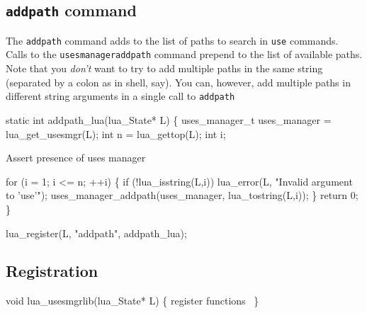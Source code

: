 \subsection{{\tt{}addpath} command}

The {\tt{}addpath} command adds to the list of paths to search in
{\tt{}use} commands.  Calls to the {\tt{}uses{}manager{}addpath} command
prepend to the list of available paths.  Note that you \emph{don't}
want to try to add multiple paths in the same string (separated by
a colon as in shell, say).  You can, however, add multiple paths
in different string arguments in a single call to {\tt{}addpath}

\nwenddocs{}\plusendmoddef
static int addpath_lua(lua_State* L)
\{
    uses_manager_t uses_manager = lua_get_usesmgr(L);
    int n = lua_gettop(L);
    int i;

    \LA{}Assert presence of uses manager~{\nwtagstyle{}}\RA{}

    for (i = 1; i <= n; ++i) \{
        if (!lua_isstring(L,i))
            lua_error(L, "Invalid argument to 'use'");
        uses_manager_addpath(uses_manager, lua_tostring(L,i));
    \}
    return 0;
\}

\nwendcode{}\nwdocspar

\nwenddocs{}\plusendmoddef
lua_register(L, "addpath", addpath_lua);
\nwendcode{}\nwdocspar


\subsection{Registration}

\nwenddocs{}\plusendmoddef
void lua_usesmgrlib(lua_State* L)
\{
    \LA{}register functions~{\nwtagstyle{}}\RA{}
\}

\nwendcode{}

%
%
%
%
%
%
%
%
\nwdocspar


\nwenddocs{}
